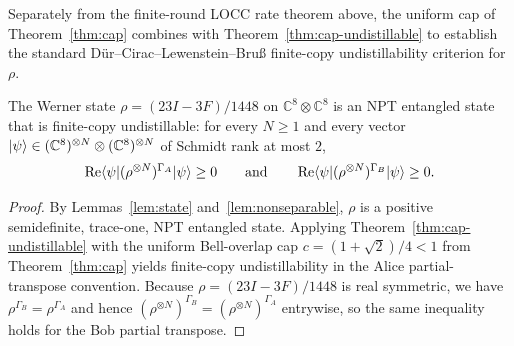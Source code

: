 Separately from the finite-round LOCC rate theorem above, the uniform cap of Theorem~\ref{thm:cap} combines with Theorem~\ref{thm:cap-undistillable} to establish the standard Dür--Cirac--Lewenstein--Bru{\ss} finite-copy undistillability criterion for $\rho$.

\begin{theorem}
\label{thm:bound}
\leanok
{}
The Werner state $\rho=(23I-3F)/1448$ on $\mathbb{C}^8\otimes\mathbb{C}^8$ is an NPT entangled state that is finite-copy undistillable: for every $N\ge 1$ and every vector $|\psi\rangle\in(\mathbb{C}^8)^{\otimes N}\otimes(\mathbb{C}^8)^{\otimes N}$ of Schmidt rank at most $2$,
\[
  \operatorname{Re}\langle \psi|(\rho^{\otimes N})^{\Gamma_A}|\psi\rangle \ge 0
  \qquad\text{and}\qquad
  \operatorname{Re}\langle \psi|(\rho^{\otimes N})^{\Gamma_B}|\psi\rangle \ge 0.
\]
\end{theorem}
\begin{proof}
\leanok
By Lemmas~\ref{lem:state} and~\ref{lem:nonseparable}, $\rho$ is a positive semidefinite, trace-one, NPT entangled state. Applying Theorem~\ref{thm:cap-undistillable} with the uniform Bell-overlap cap $c = (1+\sqrt{2})/4 < 1$ from Theorem~\ref{thm:cap} yields finite-copy undistillability in the Alice partial-transpose convention. Because $\rho = (23I-3F)/1448$ is real symmetric, we have $\rho^{\Gamma_B} = \rho^{\Gamma_A}$ and hence $(\rho^{\otimes N})^{\Gamma_B} = (\rho^{\otimes N})^{\Gamma_A}$ entrywise, so the same inequality holds for the Bob partial transpose.
\end{proof}
